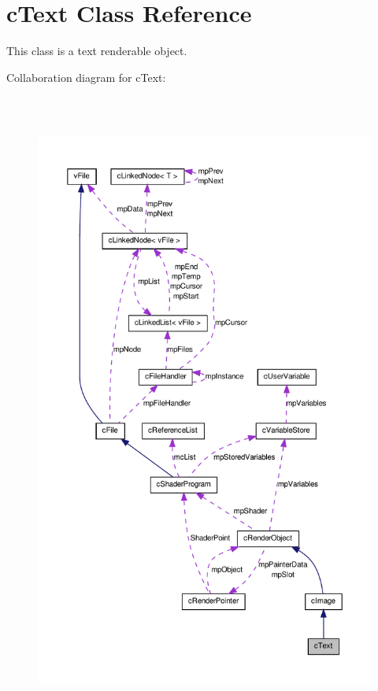 \hypertarget{classc_text}{
\section{cText Class Reference}
\label{classc_text}
}


This class is a text renderable object.  




Collaboration diagram for cText:\nopagebreak
\begin{figure}[H]
\begin{center}
\leavevmode
\includegraphics[height=600pt]{classc_text__coll__graph}
\end{center}
\end{figure}
